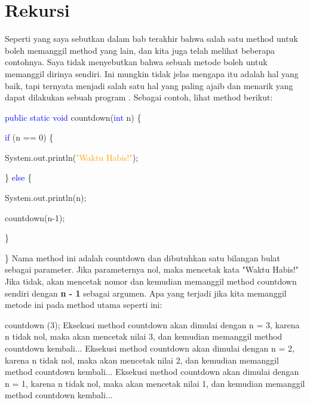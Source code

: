 \section{Rekursi}
Seperti yang saya sebutkan dalam bab terakhir bahwa salah satu method untuk boleh memanggil method yang lain, dan kita juga telah melihat beberapa contohnya. Saya tidak menyebutkan bahwa sebuah metode boleh untuk memanggil dirinya sendiri. Ini mungkin tidak jelas mengapa itu adalah hal yang baik, tapi ternyata menjadi salah satu hal yang paling ajaib dan menarik yang dapat dilakukan sebuah program .
\newline
Sebagai contoh, lihat method berikut:
\par
\textcolor{blue}{public static void} countdown(\textcolor{blue}{int} n) \{
\par
\textcolor{blue}{if} (n ==  0) \{
\par
System.out.println(\textcolor{orange}{"Waktu Habis!"});
\par
	\} \textcolor{blue}{else} \{
\par	
	System.out.println(n);
\par	
	countdown(n-1);
\par	
\}
\par
\}
\newline
Nama method ini adalah countdown dan dibutuhkan satu bilangan bulat sebagai parameter. Jika parameternya nol, maka mencetak kata "Waktu Habis!" Jika tidak, akan mencetak nomor dan kemudian memanggil method countdown sendiri dengan \textbf{n - 1} sebagai argumen. Apa yang terjadi jika kita memanggil metode ini pada method utama seperti ini:
\newline
\par
countdown (3);
\newline
\newline
Eksekusi method countdown akan dimulai dengan n = 3, karena n tidak nol, maka akan mencetak nilai 3, dan kemudian memanggil method countdown kembali...
\newline
\newline
Eksekusi method countdown akan dimulai dengan n = 2, karena n tidak nol, maka akan mencetak nilai 2, dan kemudian memanggil method countdown kembali...
\newline
\newline
Eksekusi method countdown akan dimulai dengan n = 1, karena n tidak nol, maka akan mencetak nilai 1, dan kemudian memanggil method countdown kembali...
\newline
\newline
